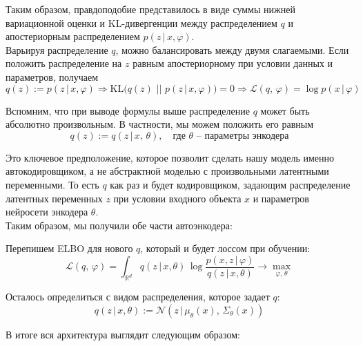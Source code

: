 \documentclass[12pt]{article}
\def\R{\mathbb{R}}       %
\theoremstyle{definition} %
\theoremstyle{plain} %
\theoremstyle{remark} %
\begin{document}
    Таким образом, правдоподобие представилось в виде суммы нижней вариационной оценки и KL-дивергенции между распределением $q$ и апостериорным распределением $p(z \, | \, x, \varphi)$. \\

    Варьируя распределение $q$, можно балансировать между двумя слагаемыми. Если положить распределение на $z$ равным апостериорному при условии данных и параметров, получаем
    \[
    q(z) := p(z \, | \, x, \varphi) \Longrightarrow \text{KL}\bigg(q(z) \,\, \big|\big| \,\,p(z \, | \, x, \varphi)\bigg) = 0 \Longrightarrow {\mathcal{L}(q, \,\varphi)} =  \log p(x \, | \, \varphi)
    \]

    \pagebreak

    Вспомним, что при выводе формулы выше распределение $q$ может быть абсолютно произвольным. В частности, мы можем положить его равным
    \[
    q(z) := q(z \, | \, x, \, \theta), \quad \text{где } \theta \text{ -- параметры энкодера}
    \]

    Это ключевое предположение, которое позволит сделать нашу модель именно автокодировщиком, а не абстрактной моделью с произвольными латентными переменными. То есть $q$ как раз и будет кодировщиком, задающим распределение латентных переменных $z$ при условии входного объекта $x$ и параметров нейросети энкодера $\theta$. \\

    Таким образом, мы получили обе части автоэнкодера:

\begin{center}
\end{center}

    Перепишем ELBO для нового $q$, который и будет лоссом при обучении:
    \[
    \mathcal{L}(q, \, \varphi) = \int_{\R^d} q(z \, | \, x, \theta) \, \log \frac{p(x, z \, | \, \varphi)}{q(z \, | \, x, \theta)} \longrightarrow \max_{\varphi, \, \theta}
    \]

    Осталось определиться с видом распределения, которое задает $q:$
    \[
    q(z \, | \, x, \theta) := \mathcal{N}(z \, | \, \mu_{\theta}(x), \, \Sigma_{\theta}(x))
    \]

    В итоге вся архитектура выглядит следующим образом:
\end{document}
